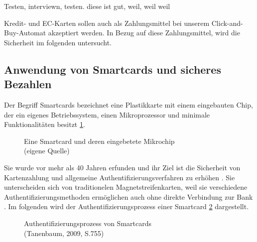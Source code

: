 Testen, interviewn, testen. diese ist gut, weil, weil weil

Kredit- und EC-Karten sollen auch als Zahlungsmittel bei unserem Click-and-Buy-Automat
akzeptiert werden. In Bezug auf diese Zahlungsmittel, wird die Sicherheit im folgenden untersucht.


\subsection{Anwendung von Smartcards und sicheres Bezahlen}
Der Begriff Smartcards bezeichnet eine Plastikkarte mit einem eingebauten Chip, der ein eigenes 
Betriebssystem, einen Mikroprozessor und minimale Funktionalitäten besitzt \ref{fig:eigenes_Bild}. 

\vfill
\begin{figure}[H]
   \caption{Eine Smartcard und deren eingebetete Mikrochip\\(eigene Quelle)}
   \label{fig:eigenes_Bild}
\end{figure}
\vfill

Sie wurde vor mehr als 40 Jahren erfunden und ihr Ziel ist die Sicherheit von Kartenzahlung und allgemeine
Authentifizierungsverfahren zu erhöhen \cite{refip:JFSB}. Sie unterscheiden sich von traditionelen 
Magnetstreifenkarten, weil sie verschiedene Authentifizierungsmethoden ermöglichen auch ohne direkte 
Verbindung zur Bank \cite{refbook:ATMS}. Im folgenden wird der Authentifizierungsprozess einer Smartcard 
\ref{fig:refbook_ATMS} dargestellt. 


\vfill
\begin{figure}[H]
   \caption{Authentifizierungsprozess von Smartcards\\(Tanenbaum, 2009, S.755)}
   \label{fig:refbook_ATMS}
\end{figure}
\vfill

